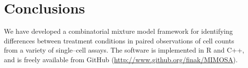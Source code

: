 \documentclass[11pt]{article}
\begin{document}
\section{Conclusions}
We have developed a combinatorial mixture model framework for identifying differences between treatment conditions in paired observations of cell counts from a variety of single--cell assays. The software is implemented in R and C++, and is freely available from GitHub (\url{http://www.github.org/finak/MIMOSA}). 



%
\end{document}
